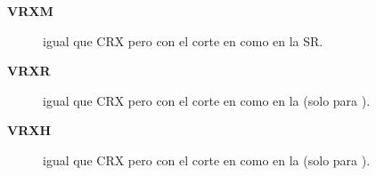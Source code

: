 \begin{description}
\item[\textbf{VRXM}] igual que CRX pero con el corte en {\met} como en la SR.
\item[\textbf{VRXR}]  igual que CRX pero con el corte en {\rt} como en la {\SRL} (solo para {\SRL}).
\item[\textbf{VRXH}]  igual que CRX pero con el corte en {\HT} como en la {\SRH} (solo para {\SRH}).
\end{description}

\begin{table}[!htbp]
  \centering

  \caption{Selección para las regiones de validación utilizadas para validar la extrapolación
    de los fondos de {\wgam}, {\ttgam}, entre las CR a las regiones de señal
    {\SRL} y {\SRH}}
  \label{tab:bkg_vrs1}


\end{table}



